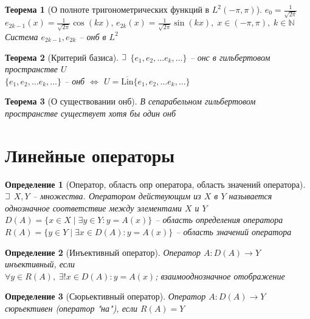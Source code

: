 \documentclass{article}
\theoremstyle{truestyle}
\newtheorem*{defenition}{Определение}
\newtheorem*{theorem}{Теорема}
\newcommand{\Lin}{\text{Lin}}
\def\letus{%
	\mathord{\setbox0=\hbox{$\exists$}%
		\hbox{\kern 0.125\wd0%
			\vbox to \ht0{%
				\hrule width 0.75\wd0%
				\vfill%
				\hrule width 0.75\wd0}%
			\vrule height \ht0%
			\kern 0.125\wd0}%
	}%
}
\begin{document}
\begin{theorem}[О полноте тригонометрических функций в $L^2(-\pi, \pi)$]
  $e_0 = \frac{1}{\sqrt{2\pi}}$\\
  $e_{2k-1}(x) = \frac{1}{\sqrt{2\pi}} \cos(kx), \, e_{2k}(x) = \frac{1}{\sqrt{2\pi}}\sin(kx), \; x \in (-\pi, \pi), \; k \in \mathbb{N}$\\
  Система $e_{2k-1}, e_{2k}$ -- онб в $L^2$
\end{theorem}

\begin{theorem}[Критерий базиса]
  $\letus$ $\{e_1, e_2, \dots e_k, \dots\}$ -- онс в гильбертовом пространстве $U$\\
  $\{e_1, e_2, \dots e_k, \dots\}$ -- онб $\Longleftrightarrow$ $U = \overline{\Lin}\{e_1, e_2, \dots e_k, \dots\}$
\end{theorem}

\begin{theorem}[О существовании онб]
  В сепарабельном гильбертовом пространстве существует хотя бы один онб
\end{theorem}

\section*{Линейные операторы}

\begin{defenition}[Оператор, область опр оператора, область значений оператора]
  $\letus$ $X, Y$ -- множества.
  Оператором действующим из $X$ в $Y$ называется однозначное соответствие между элементами $X$ и $Y$\\
  $D(A) = \{x \in X \mid \exists y \in Y: y = A(x)\}$ -- область определения оператора\\
  $R(A) = \{y \in Y \mid \exists x \in D(A): y = A(x)\}$ -- область значений оператора
\end{defenition}

\begin{defenition}[Инъективный оператор]
  Оператор $A: D(A) \rightarrow Y$ инъективный, если \\
  $\forall y \in R(A), \; \exists! x \in D(A): y = A(x)$; взаимооднозначное отображение
\end{defenition}

\begin{defenition}[Сюрьективный оператор]
  Оператор $A: D(A) \rightarrow Y$ сюрьективен (оператор "на"), если $R(A) = Y$
\end{defenition}
\end{document}
